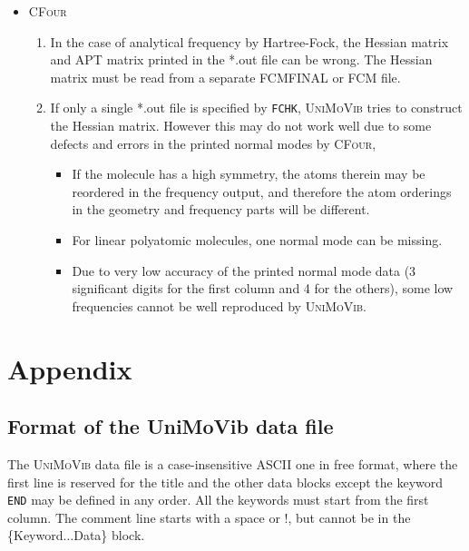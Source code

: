 \documentclass[12pt,english]{extarticle}
\begin{document}
\begin{itemize}
\item \textsc{CFour}

\begin{enumerate}
  \item In the case of analytical frequency by Hartree-Fock, the Hessian matrix and APT matrix printed in the *.out file can be wrong.
  The Hessian matrix must be read from a separate FCMFINAL or FCM file.

  \item If only a single *.out file is specified by \verb|FCHK|, \textsc{UniMoVib} tries to construct the Hessian matrix. However this may do not work well due to some defects and errors in the printed normal modes by \textsc{CFour},
  \begin{itemize}
    \item[(a)] If the molecule has a high symmetry, the atoms therein may be reordered in the frequency output, and therefore the atom orderings in the geometry and frequency parts will be different.
    \item[(b)] For linear polyatomic molecules, one normal mode can be missing.
    \item[(c)] Due to very low accuracy of the printed normal mode data (3 significant digits for the first column and 4 for the others), some low frequencies cannot be well reproduced by \textsc{UniMoVib}.
  \end{itemize}
\end{enumerate}


\end{itemize}


\pagebreak{}

\appendix
\section{Appendix} \label{part:appdx}

\subsection{Format of the UniMoVib data file} \label{sec:almfmt}

The \textsc{UniMoVib} data file is a case-insensitive ASCII one in free format, where the first line is reserved for the title and the other data blocks except the keyword \verb|END| may be defined in any order.
All the keywords must start from the first column. The comment line starts with a space or !, but cannot be in the \{Keyword$\ldots$Data\} block.
\end{document}
